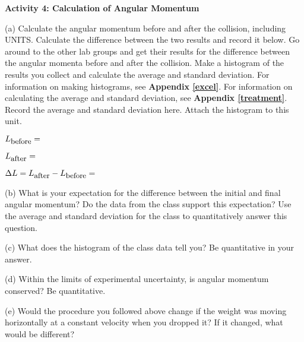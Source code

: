 \textbf{Activity 4: Calculation of Angular Momentum}

(a) Calculate the angular momentum before and after the collision, including UNITS. Calculate the difference between the two results and record it below. 
Go around to the other lab groups and get their results for the difference between the angular momenta before and after the collision.
Make a histogram of the results you collect and calculate the average and standard deviation.
For information on making histograms, see \textbf{Appendix \ref{excel}}. For information on calculating the average and
standard deviation, see \textbf{Appendix \ref{treatment}}. Record the average and standard deviation here.
Attach the histogram to this unit.
\vspace{5mm}

\( L_{\mbox{\small before}}= \)  
\vspace{5mm}

\( L_{\mbox{\small after}}= \)
\vspace{5mm}

\( \Delta L= L_{\mbox{\small after}} - L_{\mbox{\small before}} = \)  
\vspace{15mm}

(b) What is your expectation for the difference between the initial and final angular momentum?
Do the data from the class support this expectation? 
Use the average and standard deviation for the class to quantitatively answer this question.
\vspace{20mm}

(c) What does the histogram of the class data tell you? Be quantitative in your answer.
\vspace{20mm}

(d) Within the limits of experimental uncertainty, is angular momentum 
conserved?  Be quantitative.
\vspace{20mm}

(e) Would the procedure you followed above change if the weight was moving horizontally at a constant velocity when you dropped it? 
If it changed, what would be different?
\vspace{20mm}

